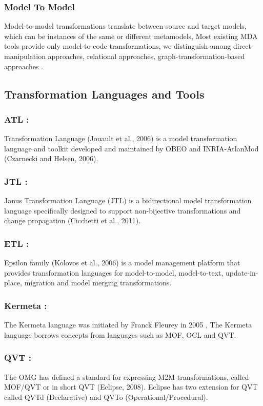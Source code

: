 \subsubsection{Model To Model}
Model-to-model transformations translate between source and target models, which can be instances of the same or different metamodels, Most existing MDA tools provide only model-to-code transformations, we distinguish among direct-manipulation approaches, relational approaches, graph-transformation-based approaches \cite{ch3catego}.

\subsection{Transformation Languages and Tools}

\subsubsection{ATL :}
Transformation Language (Jouault et al., 2006) is a model transformation language and
toolkit developed and maintained by OBEO and INRIA-AtlanMod (Czarnecki and Helsen, 2006)\cite{ch3lang}.

\subsubsection{JTL :}
Janus Transformation Language (JTL) is a bidirectional model transformation language specifically designed to support non-bijective transformations and change propagation (Cicchetti et al., 2011)\cite{ch3lang}.

\subsubsection{ETL :}
Epsilon family (Kolovos et al., 2006) is a model management platform that provides transformation languages for model-to-model, model-to-text, update-in-place, migration and model merging transformations\cite{ch3lang}.

\subsubsection{Kermeta :} 
The Kermeta language was initiated by Franck Fleurey in 2005 , The Kermeta language borrows concepts from languages such as MOF, OCL and QVT\cite{ch3lang}.

\subsubsection{QVT :} 
The OMG has defined a standard for expressing M2M transformations, called MOF/QVT or in short QVT (Eclipse, 2008). Eclipse has two extension for QVT called QVTd (Declarative) and QVTo (Operational/Procedural)\cite{ch3lang}.

